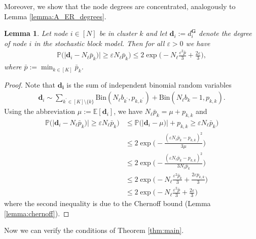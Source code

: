 \documentclass[a4paper,
               10pt,
               pdftex,
               normalheadings,
               headsepline,
               footsepline,
               headinclude,
               footinclude,
               DIV=14,
               abstracton]
{scrartcl}
\newtheorem{lemma}[theorem]{Lemma}
\newcommand{\rv}[1]{\bm{#1}}
\begin{document}
Moreover, we show that the node degrees are concentrated, analogously to Lemma \ref{lemma:A_ER_degrees}.

\begin{lemma} \label{lemma:sbm_degrees}
Let node $i \in [N]$ be in cluster $k$ and let $\rv{d}_i := d_i^{\rv{G}}$ denote the degree of node $i$ in the stochastic block model.
Then for all $\varepsilon > 0 $ we have
\begin{align}
    \mathbb{P}\Big(\lvert \rv{d}_i - N_\ell \bar{p}_k) \rvert \geq \varepsilon N_\ell \bar{p}_k \Big) \leq 2 \exp\Big(- N_\ell \frac{\varepsilon^2 \bar{p}}{3} + \frac{2 \varepsilon}{3} \Big),
\end{align}
where $\bar{p} := \min_{k\in [K]} \bar{p}_k$.
\end{lemma}
\begin{proof}
    Note that $\rv{d_i}$ is the sum of independent binomial random variables
    \begin{align}
        \rv{d}_i \sim \sum_{{k^\prime} \in [K]\setminus \{k\}} \text{Bin}(N_\ell b_{k^\prime}, p_{k, {k^\prime}}) + \text{Bin}(N_\ell b_k - 1, p_{k, k}).
    \end{align}
    Using the abbreviation $\mu := \mathbb{E}[\rv{d}_i]$, we have $N_\ell \bar{p}_k = \mu + p_{k, k}$ and 
    \begin{align}
        \mathbb{P}\Big(\lvert \rv{d}_i - N_\ell \bar{p}_k) \rvert \geq \varepsilon N_\ell \bar{p}_k \Big)
        &\leq \mathbb{P}\Big(\lvert \rv{d}_i - \mu) \rvert + p_{k,k} \geq \varepsilon N_\ell \bar{p}_k \Big)\\
        &\leq 2 \exp\Big(- \frac{(\varepsilon N_\ell \bar{p}_k - p_{k,k})^2}{3 \mu} \Big)\\
        &\leq  2 \exp\Big(- \frac{(\varepsilon N_\ell \bar{p}_k - p_{k,k})^2}{3 N_\ell \bar{p}_k} \Big)\\
        &\leq  2 \exp\Big(- N_\ell \frac{\varepsilon^2 \bar{p}_k}{3} + \frac{2 \varepsilon p_{k,k}}{3} \Big)\\
        &\leq  2 \exp\Big(- N_\ell \frac{\varepsilon^2 \bar{p}}{3} + \frac{2 \varepsilon}{3} \Big)
    \end{align}
    where the second inequality is due to the Chernoff bound (Lemma \ref{lemma:chernoff}).
\end{proof}

Now we can verify the conditions of Theorem \ref{thm:main}.
\end{document}
